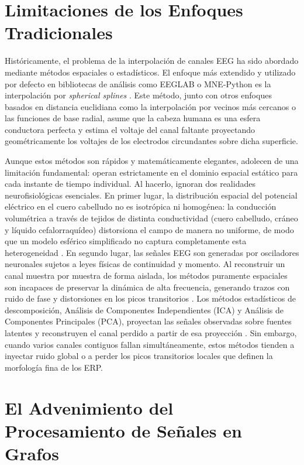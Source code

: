 \section{Limitaciones de los Enfoques Tradicionales}

Históricamente, el problema de la interpolación de canales EEG ha sido abordado mediante métodos espaciales o estadísticos. El enfoque más extendido y utilizado por defecto en bibliotecas de análisis como EEGLAB \cite{delorme2004eeglab} o MNE-Python \cite{gramfort2013meg,gramfort2014mne} es la interpolación por \textit{spherical splines} \cite{perrin1989}. Este método, junto con otros enfoques basados en distancia euclidiana como la interpolación por vecinos más cercanos o las funciones de base radial, asume que la cabeza humana es una esfera conductora perfecta y estima el voltaje del canal faltante proyectando geométricamente los voltajes de los electrodos circundantes sobre dicha superficie.

Aunque estos métodos son rápidos y matemáticamente elegantes, adolecen de una limitación fundamental: operan estrictamente en el dominio espacial estático para cada instante de tiempo individual. Al hacerlo, ignoran dos realidades neurofisiológicas esenciales. En primer lugar, la distribución espacial del potencial eléctrico en el cuero cabelludo no es isotrópica ni homogénea: la conducción volumétrica a través de tejidos de distinta conductividad (cuero cabelludo, cráneo y líquido cefalorraquídeo) distorsiona el campo de manera no uniforme, de modo que un modelo esférico simplificado no captura completamente esta heterogeneidad \cite{nunez2006electric}. En segundo lugar, las señales EEG son generadas por osciladores neuronales sujetos a leyes físicas de continuidad y momento. Al reconstruir un canal muestra por muestra de forma aislada, los métodos puramente espaciales son incapaces de preservar la dinámica de alta frecuencia, generando trazos con ruido de fase y distorsiones en los picos transitorios \cite{lai2005controlled}.
Los métodos estadísticos de descomposición, Análisis de Componentes Independientes (ICA) y Análisis de Componentes Principales (PCA), proyectan las señales observadas sobre fuentes latentes y reconstruyen el canal perdido a partir de esa proyección \cite{jung2001imaging}. Sin embargo, cuando varios canales contiguos fallan simultáneamente, estos métodos tienden a inyectar ruido global o a perder los picos transitorios locales que definen la morfología fina de los ERP.

\section{El Advenimiento del Procesamiento de Señales en Grafos}

